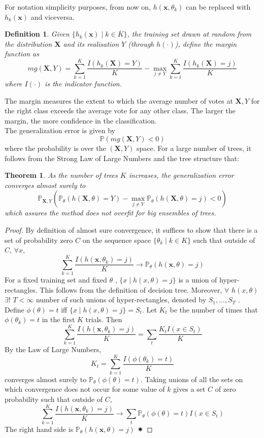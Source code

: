 \documentclass[a4paper,12pt]{article}
\newtheorem{definition}{Definition}[section]
\newtheorem{theorem}{Theorem}[section]
\begin{document}
For notation simplicity purposes, from now on, $h( \textbf{x},  \theta_{k} )$ can be replaced with $h _{k}( \textbf{x} )$ and viceversa.
\begin{definition}
Given $\{h_{k} ( \textbf{x}) \mid k \in  \overline{K} \}$, the training set drawn
at random from the distribution $\textbf{X}$ and its realisation $Y$ (through $h(\cdot)$), define the margin function as $$mg(\textbf{X},Y)= \sum_{k=1}^{K} \frac{I(h_{k}(\textbf{X})=Y) }{K} - \max_{j \neq Y}  \sum_{k=1}^{K}\frac{I(h_{k}(\textbf{X})=j) }{K} $$
where $I (\cdot)$ is the indicator function. 
\end{definition}
The margin measures the extent to which the average number of votes at $\textbf{X}, Y$ for the right class exceeds the average vote for any other class. The larger the margin, the more confidence in the classification. \\
The generalization error is given by
$$\mathbb{P}(mg(\textbf{X}, Y)<0)$$
where the probability is over the $(\textbf{X}, Y)$ space.
For a large number of trees, it follows from the
Strong Law of Large Numbers and the tree structure that:
\begin{theorem}
As the number of trees $K$ increases, the generalization error converges almost surely to
$$\mathbb{P}_{\textbf{X}, Y}(\mathbb{P}_{\theta}(h(\textbf{X}, \theta) = Y)- \max_{j \neq Y} \mathbb{P}_{\theta}(h(\textbf{X}, \theta) = j) < 0)$$
which assures the method does not overfit for big ensembles of trees.
\end{theorem}

\begin{proof}
By definition of almost sure convergence, it suffices to show that there is a set of probability zero $C$ on the sequence space  $\{\theta_{k} \mid k \in K \}$ such that outside of $C$, $\forall x$,
$$ \sum_{k=1}^{K} \frac{I(h(\textbf{x},\theta_{k})= j) }{K} \rightarrow \mathbb{P}_{\theta}(h(\textbf{x}, \theta) = j)$$
For a fixed training set and fixed $\theta$ , $\{x \mid h(x, \theta) = j \}$ is a union of hyper-rectangles. This follows from the definition of decision tree. Moreover, $\forall$  $h(x, \theta)$ $\exists !$ $ T < \infty$ number of such unions of hyper-rectangles, denoted by $S_{1},..., S_{T}$ . Define $\phi(\theta) = t$ iff $\{x \mid  h(x, \theta) = j \} = S_{t}$. Let $K_{t}$ be the number of times that $\phi(\theta_{k}) = t$ in the first $K$ trials. Then
$$ \sum_{k=1}^{K} \frac{I(h(\textbf{x},\theta_{k})= j) }{K} = \sum_{t} \frac{K_{t}I(x \in S_{t}) }{K}$$
By the Law of Large Numbers,
$$K_{t} = \sum_{k=1}^{K} \frac{I(\phi(\theta_{k})= t) }{K} $$
converges almost surely to $\mathbb{P}_{\theta}(\phi(\theta) = t)$. Taking unions of all the sets on which convergence does not occur for some value of $k$ gives a set $C$ of zero probability such that outside of $C$,
$$ \sum_{k=1}^{K} \frac{I(h(\textbf{x},\theta_{k})= j) }{K} \rightarrow \sum_{t} \mathbb{P}_{\theta}(\phi(\theta) = t)I(x \in S_{t})$$
The right hand side is $\mathbb{P}_{\theta}(h(\textbf{x}, \theta) = j)$ ✷
\end{proof}
\end{document}
